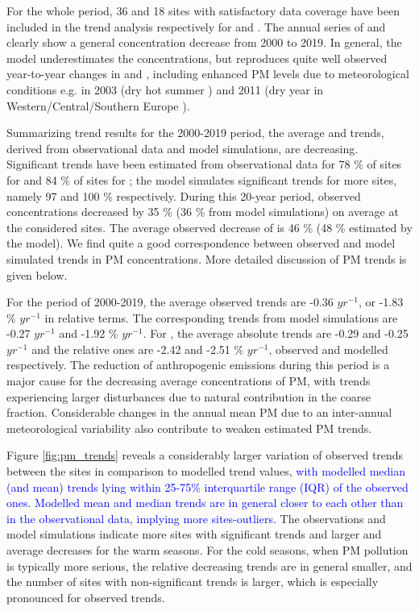 For the whole period, 36 and 18 sites with satisfactory data coverage have been included in the trend analysis respectively for \PM[10] and \PM[2.5]. The annual series of \PM[10] and \PM[2.5] clearly show a general concentration decrease from 2000 to 2019. In general, the model underestimates the concentrations, but reproduces quite well observed year-to-year changes in \PM[10] and \PM[2.5], including enhanced PM levels due to meteorological conditions e.g. in 2003 (dry hot summer \citep{EMEP:PM2005}) and 2011 (dry year in Western/Central/Southern Europe \citep{EMEP:PM2013}).

Summarizing trend results for the 2000-2019 period, the average \PM[10] and \PM[2.5] trends, derived from observational data and model simulations, are decreasing. Significant trends have been estimated from observational data for 78 \% of sites for \PM[10] and 84 \% of sites for \PM[2.5]; the model simulates significant trends for more sites, namely 97 and 100 \% respectively. During this 20-year period, observed \PM[10] concentrations decreased by 35 \%  (36 \% from model simulations) on average at the considered sites. The average observed decrease of \PM[2.5] is 46 \%  (48 \% estimated by the model). We find quite a good correspondence between observed and model simulated trends in PM concentrations. More detailed discussion of PM trends is given below.

For the period of 2000-2019, the average observed \PM[10] trends are -0.36 \ug $yr^{-1}$, or -1.83 \% $yr^{-1}$ in relative terms. The corresponding \PM[10] trends from model simulations are -0.27 \ug $yr^{-1}$ and -1.92 \% $yr^{-1}$. For \PM[2.5], the average absolute trends are -0.29 and -0.25 \ug $yr^{-1}$ and the relative ones are -2.42 and -2.51 \% $yr^{-1}$, observed and modelled respectively. The reduction of anthropogenic emissions during this period is a major cause for the decreasing average concentrations of PM, with \PM[10] trends experiencing larger disturbances due to natural contribution in the coarse fraction. Considerable changes in the annual mean PM due to an inter-annual meteorological variability also contribute to weaken estimated PM trends.

Figure \ref{fig:pm_trends} reveals a considerably larger variation of observed trends between the sites in comparison to modelled trend values, \textcolor{blue}{with modelled median (and mean) trends lying within 25-75\% interquartile range (IQR) of the observed ones. Modelled mean and median trends are in general closer to each other than in the observational data, implying more sites-outliers.} The observations and model simulations indicate more sites with significant trends and larger \PM[10] and \PM[2.5] average decreases for the warm seasons. For the cold seasons, when PM pollution is typically more serious, the relative decreasing trends are in general smaller, and the number of sites with non-significant trends is larger, which is especially pronounced for observed \PM[10] trends.


